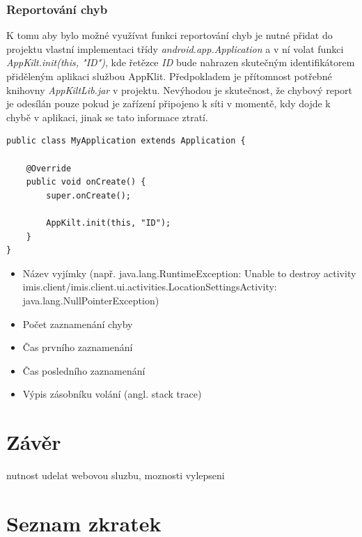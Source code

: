 \documentclass{diplomka}
\begin{document}
\subsection*{Reportování chyb}
K tomu aby bylo možné využívat funkci reportování chyb je nutné přidat do projektu vlastní implementaci třídy \emph{android.app.Application} a v ní volat funkci \emph{AppKilt.init(this, "ID")}, kde řetězce \emph{ID} bude nahrazen skutečným identifikátorem přiděleným aplikaci službou AppKlit. Předpokladem je přítomnost potřebné knihovny \emph{AppKiltLib.jar} v projektu. Nevýhodou je skutečnost, že chybový report je odesílán pouze pokud je zařízení připojeno k síti v momentě, kdy dojde k chybě v aplikaci, jinak se tato informace ztratí. 
\begin{lstlisting}
public class MyApplication extends Application {

	@Override
	public void onCreate() {
		super.onCreate();
		
		AppKilt.init(this, "ID");
	}
}
\end{lstlisting}

\begin{itemize}[noitemsep,nolistsep]
\item Název vyjímky (např. java.lang.RuntimeException: Unable to destroy activity {imis.client/imis.client.ui.activities.LocationSettingsActivity}: \\java.lang.NullPointerException)
\item Počet zaznamenání chyby
\item Čas prvního zaznamenání
\item Čas posledního zaznamenání
\item Výpis zásobníku volání (angl. stack trace)


\end{itemize}

\chapter{Závěr}
nutnost udelat webovou sluzbu, moznosti vylepseni

\chapter*{Seznam zkratek} 
\end{document}
